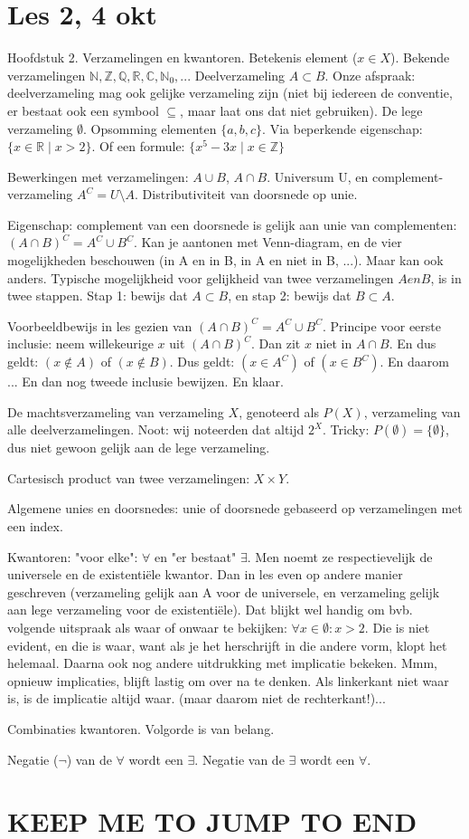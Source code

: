 \documentclass{article}
\begin{document}
\section{Les 2, 4 okt}

Hoofdstuk 2. Verzamelingen en kwantoren. Betekenis element ($x \in X$). Bekende verzamelingen $\mathbb{N}, \mathbb{Z}, \mathbb{Q}, \mathbb{R}, \mathbb{C}, \mathbb{N}_0, ... $
Deelverzameling $A \subset B$. Onze afspraak: deelverzameling mag ook gelijke verzameling zijn (niet bij iedereen de conventie, er bestaat ook een symbool $\subseteq$, maar laat ons dat niet gebruiken). De lege verzameling $\emptyset$. Opsomming elementen $\{a,b,c\}$. Via beperkende eigenschap: $\{x\in \mathbb{R} \mid x>2 \} $. Of een formule: $\{x^5 -3x  \mid  x \in \mathbb{Z} \} $

Bewerkingen met verzamelingen: $A \cup B$, $A \cap B$. Universum U, en complement-verzameling $A^C = U \setminus A$. Distributiviteit van doorsnede op unie. 

Eigenschap: complement van een doorsnede is gelijk aan unie van complementen: $(A \cap B)^C = A^C \cup B^C$. Kan je aantonen met Venn-diagram, en de vier mogelijkheden beschouwen (in A en in B, in A en niet in B, ...). Maar kan ook anders. Typische mogelijkheid voor gelijkheid van twee verzamelingen $A en B$, is in twee stappen. Stap 1: bewijs dat $A \subset B$, en stap 2: bewijs dat $B \subset A$. 

Voorbeeldbewijs in les gezien van $(A \cap B)^C = A^C \cup B^C$. Principe voor eerste inclusie: neem willekeurige $x$ uit $(A \cap B)^C$. Dan zit  $x$ niet in $A \cap B$. En dus geldt: $(x\notin A)$ of $(x\notin B)$. Dus geldt: $(x \in A^C)$ of $(x\in B^C)$. En daarom ... En dan nog tweede inclusie bewijzen. En klaar. 

De machtsverzameling van verzameling $X$, genoteerd als $P(X)$, verzameling van alle deelverzamelingen. Noot: wij noteerden dat altijd $2^X$. Tricky: $P(\emptyset) = \{ \emptyset \}$, dus niet gewoon gelijk aan de lege verzameling. 

Cartesisch product van twee verzamelingen: $X \times Y$. 

Algemene unies en doorsnedes: unie of doorsnede gebaseerd op verzamelingen met een index. 

Kwantoren: "voor elke": $\forall$  en "er bestaat" $\exists$. Men noemt ze respectievelijk  de universele en de existenti\"ele kwantor. Dan in les even op andere manier geschreven (verzameling gelijk aan A voor de universele, en verzameling gelijk aan lege verzameling voor de existenti\"ele). Dat blijkt wel handig om bvb. volgende uitspraak als waar of onwaar te bekijken: $\forall x \in \emptyset : x>2$. Die is niet evident, en die is waar, want als je het herschrijft in die andere vorm, klopt het helemaal. 
Daarna ook nog andere uitdrukking met implicatie bekeken. Mmm, opnieuw implicaties, blijft lastig om over na te denken. Als linkerkant niet waar is, is de implicatie altijd waar. (maar daarom niet de rechterkant!)... 

Combinaties kwantoren. Volgorde is van belang. 

Negatie ($\lnot$) van de $\forall$ wordt een $\exists$. Negatie van de $\exists$ wordt een $\forall$. 



\section{KEEP ME TO JUMP TO END}
\end{document}
